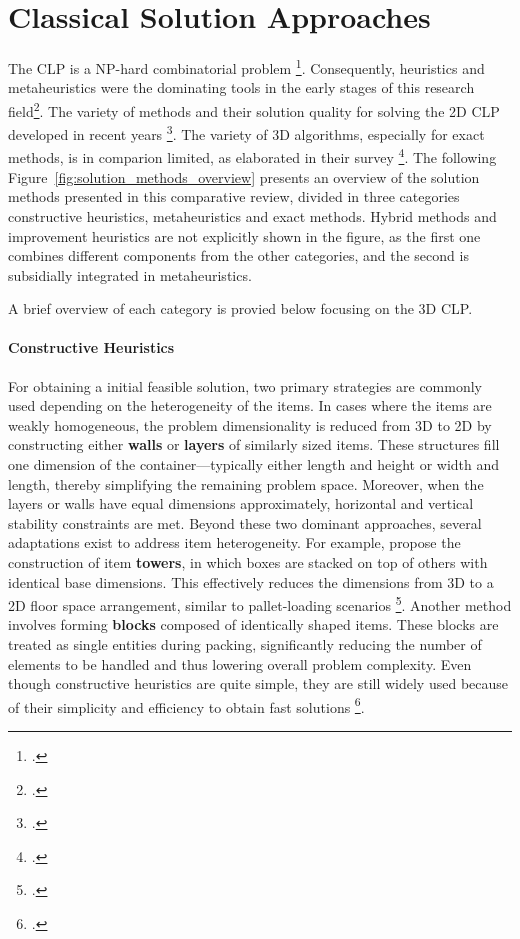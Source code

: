 \chapter{Classical Solution Approaches}
\label{sec:classical_solution_approaches}
The \gls{CLP} is a NP-hard combinatorial problem \footcite[cf.][p.11]{bortfeldt_constraints_2013}.
Consequently, heuristics and metaheuristics were the dominating tools
in the early stages of this research field\footcite[cf.][]{pisinger_heuristics_2002}. The variety of methods
and their solution quality for solving the 2D \gls{CLP} developed in recent years \footcite[cf.][p.23]{iori_exact_2021}.
The variety of 3D algorithms, especially for exact methods, is in comparion limited, as
\citeauthor*{zhao_comparative_2016} elaborated in their survey \footcite[cf.][]{zhao_comparative_2016}.
The following Figure~\ref{fig:solution_methods_overview} presents an overview of the solution methods
presented in this comparative review, divided in three categories constructive heuristics, metaheuristics
and exact methods. Hybrid methods and improvement heuristics are not explicitly shown in the figure,
as the first one combines different components from the other categories, and the second is subsidially
integrated in metaheuristics.



A brief overview of each category is provied below focusing on the 3D \gls{CLP}.

\subsubsection{Constructive Heuristics}
For obtaining a initial feasible solution, two primary strategies are commonly
used depending on the heterogeneity of the items. In cases where the items are weakly homogeneous,
the problem dimensionality is reduced from 3D to 2D by constructing either
\textbf{walls} or \textbf{layers} of similarly sized items. These structures fill one
dimension of the container—typically either length and height or width and length, thereby
simplifying the remaining problem space. Moreover, when the layers or walls have
equal dimensions approximately, horizontal and vertical stability constraints are met.
Beyond these two dominant approaches, several adaptations exist to address item heterogeneity.
For example, \citeauthor{gehring_genetic_1997} propose the construction of item
\textbf{towers}, in which boxes are stacked on top of others with identical base dimensions.
This effectively reduces the dimensions from 3D to a 2D floor space arrangement,
similar to pallet-loading scenarios \footcite[cf.][pp. 402--406]{gehring_genetic_1997}.
Another method involves forming \textbf{blocks} composed of identically shaped items.
These blocks are treated as single entities
during packing, significantly reducing the number of elements to be handled and thus
lowering overall problem complexity. Even though constructive heuristics are quite simple,
they are still widely used because of their simplicity and efficiency to obtain fast solutions
\footcite[cf.][pp. 11--13]{tamke_branch-and-cut_2024}.

